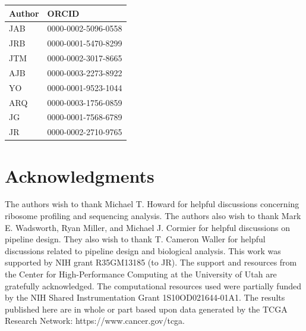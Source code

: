 \documentclass[10pt, oneside]{article}
\newcommand{\beginsupplement}{%
  \setcounter{table}{0}
  \renewcommand{\thetable}{S\arabic{table}}%
  \setcounter{figure}{0}
  \renewcommand{\thefigure}{S\arabic{figure}}%
}
\begin{document}
\begin{table}[!]
    \centering
{}
\begin{tabular}{p{2.4cm}p{7.5cm}}
 \textbf{Author} & \textbf{ORCID}\\
 \hline
 JAB & 0000-0002-5096-0558 \\
 \hline
 JRB & 0000-0001-5470-8299 \\
 \hline
 JTM & 0000-0002-3017-8665 \\
 \hline
 AJB & 0000-0003-2273-8922 \\
 \hline
 YO & 0000-0001-9523-1044 \\
 \hline
 ARQ & 0000-0003-1756-0859 \\
 \hline
 JG & 0000-0001-7568-6789 \\
 \hline
 JR & 0000-0002-2710-9765 \\
\end{tabular}
\end{table}

\section*{Acknowledgments}
The authors wish to thank Michael T. Howard for helpful discussions concerning ribosome profiling and sequencing analysis. The authors also wish to thank Mark E. Wadsworth, Ryan Miller, and Michael J. Cormier for helpful discussions on pipeline design. They also wish to thank T. Cameron Waller for helpful discussions related to pipeline design and biological analysis. This work was supported by NIH grant R35GM13185 (to JR). The support and resources from the Center for High-Performance Computing at the University of Utah are gratefully acknowledged. The computational resources used were partially funded by the NIH Shared Instrumentation Grant 1S10OD021644-01A1. The results published here are in whole or part based upon data generated by the TCGA Research Network: https://www.cancer.gov/tcga.




\beginsupplement
\end{document}
